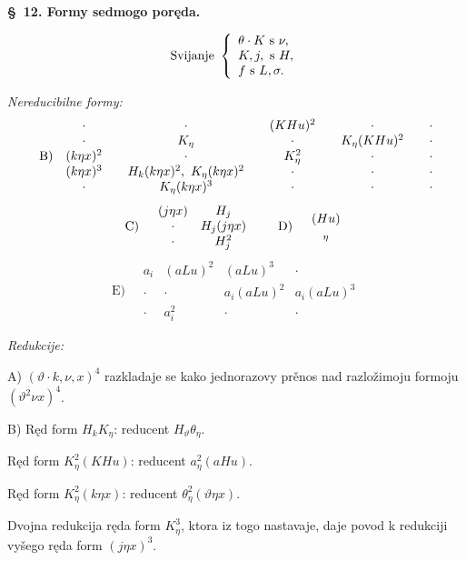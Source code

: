 \documentclass[11pt]{article}
\let\A\relax
\newcommand{\A}{\mathfrak A}
\begin{document}
\begin{center}
\textbf{\S\ 12. \quad Formy sedmogo poręda.}
\end{center}
\[
\text{Svijanje }\left\{\begin{array}{l}
\theta\cdot K \text{ s }\nu,\\
K,j,\A \text{ s }H,\\
f \text{ s }L,\sigma.
\end{array}\right.
\]

\noindent\textit{Nereducibilne formy:}
\[
\mathrm{B)}\quad
\begin{array}{@{}c@{\qquad}c@{\qquad}c@{\qquad}c@{\qquad}c@{}}
\cdot&\cdot&(KHu)^2&\cdot&\cdot\\
\cdot&K_\eta&\cdot&K_\eta(KHu)^2&\cdot\\
(k\eta x)^2&\cdot&K_\eta^2&\cdot&\cdot\\
(k\eta x)^3&H_k(k\eta x)^2,\ K_\eta(k\eta x)^2&\cdot&\cdot&\cdot\\
\cdot&K_\eta(k\eta x)^3&\cdot&\cdot&\cdot
\end{array}
\]
\[
\mathrm{C)}\quad
\begin{array}{cc}
(j\eta x)&H_j\\
\cdot&H_j(j\eta x)\\
\cdot&H_j^2
\end{array}
\qquad
\mathrm{D)}\quad
\begin{array}{c}
(\A Hu)\\\A_\eta
\end{array}
\]
\[
\mathrm{E)}\quad
\begin{array}{cccc}
a_i&(aLu)^2&(aLu)^3&\cdot\\
\cdot&\cdot&a_i(aLu)^2&a_i(aLu)^3\\
\cdot&a_i^2&\cdot&\cdot
\end{array}
\]

\noindent\textit{Redukcije:}

\noindent\mbox{A)} $(\vartheta\cdot k,\nu,x)^4$ razkladaje se kako jednorazovy prěnos nad razložimoju formoju $(\vartheta^2\nu x)^4$.

\noindent\mbox{B)} Ręd form $H_kK_\eta$: reducent $H_\vartheta\theta_\eta$.

Ręd form $K_\eta^2(KHu)$: reducent $a_\eta^2(aHu)$.

Ręd form $K_\eta^2(k\eta x)$: reducent $\theta_\eta^2(\vartheta\eta x)$.

Dvojna redukcija ręda form $K_\eta^3$, ktora iz togo nastavaje, daje povod k redukciji vyšego ręda form $(j\eta x)^3$.
\end{document}
